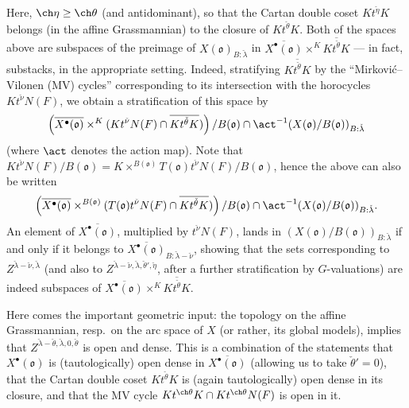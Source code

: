 Here, $\ch\eta \ge \ch\theta$ (and antidominant), so that the Cartan double coset $K t^{\check\eta} K$ belongs (in the affine Grassmannian) to the closure of $K t^{\check\theta} K$. Both of the spaces above are subspaces of the preimage of $X(\mathfrak o)_{B:\check\lambda}$ in $\overline{X^\bullet(\mathfrak o)} \times^{K} \overline{K t^{\check\theta} K}$ --- in fact, substacks, in the appropriate setting. Indeed, stratifying $\overline{K t^{\check\theta} K}$ by the ``Mirkovi\'c--Vilonen (MV) cycles'' corresponding to its intersection with the horocycles $K t^{\check\nu} N(F)$, we obtain a stratification of this space by
\[\left(\overline{X^\bullet(\mathfrak o)}  \times^K (K t^{\check\nu} N(F) \cap \overline{K t^{\check\theta} K})\right)/B(\mathfrak o) \cap \act^{-1} (X(\mathfrak o)/B(\mathfrak o))_{B:\check\lambda}\]
(where $\act$ denotes the action map). Note that $K t^{\check\nu} N(F) /B(\mathfrak o) = K\times^{B(\mathfrak o)} T(\mathfrak o) t^{\check\nu} N(F) /B(\mathfrak o)$, hence the above can also be written
\[\left(\overline{X^\bullet(\mathfrak o)}  \times^{B(\mathfrak o)} (T(\mathfrak o) t^{\check\nu} N(F) \cap \overline{K t^{\check\theta} K})\right)/B(\mathfrak o) \cap \act^{-1} (X(\mathfrak o)/B(\mathfrak o))_{B:\check\lambda}.\]
An element of $\overline{X^\bullet(\mathfrak o)}$, multiplied by $t^{\check\nu} N(F)$, lands in $(X(\mathfrak o)/B(\mathfrak o))_{B:\check\lambda}$ if and only if it belongs to $\overline{X^\bullet(\mathfrak o)}_{B:\check\lambda-\check\nu}$, showing that the sets corresponding to $Z^{\check\lambda - \check\nu, \check\lambda}$ (and also to $Z^{\check\lambda - \check\nu, \check\lambda, \check\theta',\check\eta}$, after a further stratification by $G$-valuations) are indeed subspaces of $\overline{X^\bullet(\mathfrak o)} \times^{K} \overline{K t^{\check\theta} K}$.


Here comes the important geometric input: the topology on the affine Grassmannian, resp.\ on the arc space of $X$ (or rather, its global models), implies that $Z^{\check\lambda - \check\theta, \check\lambda, 0,\check\theta}$ is open and dense. This is a combination of the statements that $X^\bullet(\mathfrak o)$ is (tautologically) open dense in $\overline{X^\bullet(\mathfrak o)}$ (allowing us to take $\check\theta'=0$), that the Cartan double coset $K t^{\check\theta} K$ is (again tautologically) open dense in its closure, and that the MV cycle $K t^{\ch\theta} K \cap K t^{\ch\theta} N(F)$ is open in it.

